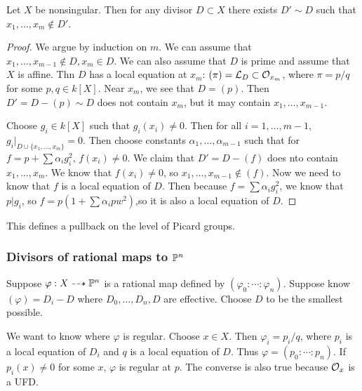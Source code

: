 \documentclass[twoside, 10pt]{article}
\begin{document}
        \begin{lem} Let $X$ be nonsingular. Then for any divisor $D \subset X$
            there exists $D' \sim D$ such that $x_1, \ldots, x_m \notin D'$.
            \begin{proof} We argue by induction on $m$. We can assume that
                $x_1, \ldots, x_{m-1} \notin D, x_m \in D$. We can also assume
                that $D$ is prime and assume that $X$ is affine. Thn $D$ has a
                local equation at $x_m$: $(\pi) = \mc{L}_D \subset
                \mc{O}_{x_m}$, where $\pi = p/q$ for some $p,q \in k[X]$. Near
                $x_m$, we see that $D = (p)$. Then $D' = D-(p) \sim D$ does not
                contain $x_m$, but it may contain $x_1, \ldots, x_{m-1}$.

                Choose $g_i \in k[X]$ such that $g_i(x_i) \neq 0$. Then for all
                $i = 1, \ldots, m-1$, $g_i|_{D \cup \{x_1, \ldots, x_m\}} = 0.$
                Then choose constants $\alpha_1, \ldots, \alpha_{m-1}$ such
                that for $f = p+\sum\alpha_i g_i^2$, $f(x_i) \neq 0$. We claim
                that $D' = D-(f)$ does nto contain $x_1, \ldots, x_m$. We know
                that $f(x_i) \neq 0$, so $x_1, \ldots, x_{m-1} \notin (f)$. Now
                we need to know that $f$ is a local equation of $D$. Then
            because $f = \sum \alpha_i g_i^2$, we know that $p|g_i$, so $f =
        p(1+\sum \alpha_i pw^2)$,so it is also a local equation of $D$.
    \end{proof} \end{lem}

        This defines a pullback on the level of Picard groups.

        \subsubsection{Divisors of rational maps to $\P^n$} Suppose $\varphi: X
        \dashrightarrow \P^n$ is a rational map defined by $(\varphi_0: \cdots
        : \varphi_n)$. Suppose know $(\varphi) = D_i - D$ where $D_0, \ldots,
        D_n,D$ are effective. Choose $D$ to be the smallest possible.

        We want to know where $\varphi$ is regular. Choose $x \in X$. Then
        $\varphi_i = p_i/q$, where $p_i$ is a local equation of $D_i$ and $q$
        is a local equation of $D$. Thus $\varphi = (p_0: \cdots : p_n).$ If
        $p_i(x) \neq 0$ for some $x$, $\varphi$ is regular at $p$. The converse
        is also true because $\mc{O}_x$ is a UFD.
        
\end{document}
